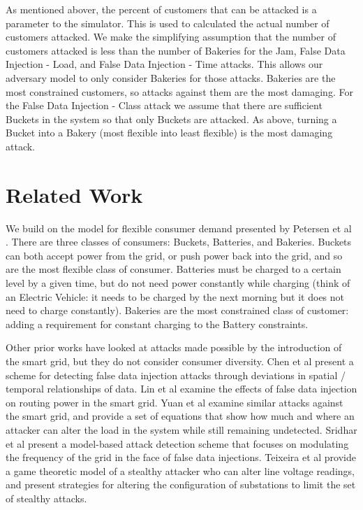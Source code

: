 \documentclass[conference]{IEEEtran}
\begin{document}
As mentioned abover, the percent of customers that can be attacked is a parameter to the simulator.  This is used to calculated the actual number of customers attacked.  We make the simplifying assumption that the number of customers attacked is less than the number of Bakeries for the Jam, False Data Injection - Load, and False Data Injection - Time attacks.  This allows our adversary model to only consider Bakeries for those attacks.  Bakeries are the most constrained customers, so attacks against them are the most damaging.  For the False Data Injection - Class attack we assume that there are sufficient Buckets in the system so that only Buckets are attacked.  As above, turning a Bucket into a Bakery (most flexible into least flexible) is the most damaging attack.




\section{Related Work}
\label{Related Work}

We build on the model for flexible consumer demand presented by Petersen et al \cite{petersen2013taxonomy}. There are three classes of consumers: Buckets, Batteries, and Bakeries. Buckets can both accept power from the grid, or push power back into the grid, and so are the most flexible class of consumer. Batteries must be charged to a certain level by a given time, but do not need power constantly while charging (think of an Electric Vehicle: it needs to be charged by the next morning but it does not need to charge constantly). Bakeries are the most constrained class of customer: adding a requirement for constant charging to the Battery constraints.

Other prior works have looked at attacks made possible by the introduction of the smart grid, but they do not consider consumer diversity. Chen et al \cite{chen2015detection} present a scheme for detecting false data injection attacks through deviations in spatial / temporal relationships of data. Lin et al \cite{lin2012false} examine the effects of false data injection on routing power in the smart grid. Yuan et al \cite{yuan2011modeling} examine similar attacks against the smart grid, and provide a set of equations that show how much and where an attacker can alter the load in the system while still remaining undetected. Sridhar et al \cite{sridhar2014model} present a model-based attack detection scheme that focuses on modulating the frequency of the grid in the face of false data injections. Teixeira et al \cite{teixeira2014security} provide a game theoretic model of a stealthy attacker who can alter line voltage readings, and present strategies for altering the configuration of substations to limit the set of stealthy attacks. 
\end{document}
